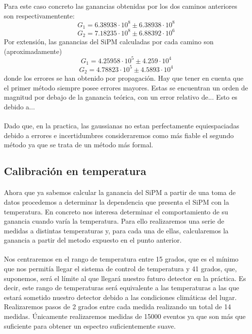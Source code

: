 \documentclass[11pt, a4paper]{article}
\begin{document}
\begin{itemize}
\begin{itemize}
	
	\end{itemize}
	
Para este caso concreto las ganancias obtenidas por los dos caminos anteriores son respectivamentente:
$$G_1= 6.38938 \cdot 10^8 \pm  6.38938 \cdot 10^8 $$  
$$G_2=7.18235 \cdot 10^8 \pm 6.88392 \cdot 10^6$$
Por extensión, las ganancias del SiPM calculadas por cada camino son (aproximadamente) 
$$G_1= 4.25958 \cdot 10^5 \pm 4.259 \cdot 10^4$$  
$$G_2= 4.78823 \cdot 10^5 \pm 4.5893 \cdot 10^4$$
donde los errores se han obtenido por propagación. Hay que tener en cuenta que el primer método siempre posee errores mayores. Estas se encuentran un orden de magnitud por debajo de la ganancia teórica, con un error relativo de... Esto es debido a...

\paragraph {}
Dado que, en la practica, las gaussianas no estan perfectamente equiespaciadas debido a errores e incertidumbres consideraremos como más fiable el segundo método ya que se trata de un método más formal. 


\end{itemize}

\subsection {Calibración en temperatura}
\paragraph {}
Ahora que ya sabemos calcular la ganancia del SiPM a partir de una toma de datos procedemos a determinar la dependencia que presenta el SiPM con la temperatura. En concreto nos interesa determinar el comportamiento de su ganancia cuando varía la temperatura. Para ello realizaremos una serie de medidas a distintas temperaturas y, para cada una de ellas, calcularemos la ganancia a partir del metodo expuesto en el punto anterior.

\paragraph {}
Nos centraremos en el rango de temperatura entre 15 grados, que es el mínimo que nos permitía llegar el sistema de control de temperatura y 41 grados, que, suponemos, será el límite al que llegará nuestro futuro detector en la práctica. Es decir, este rango de temperaturas será equivalente a las temperaturas a las que estará sometido nuestro detector debido a las condiciones climáticas del lugar. Realizaremos pasos de 2 grados entre cada medida realizando un total de 14 medidas. Únicamente realizaremos medidas de 15000 eventos ya que son más que suficiente para obtener un espectro suficientemente suave. 
\end{document}
